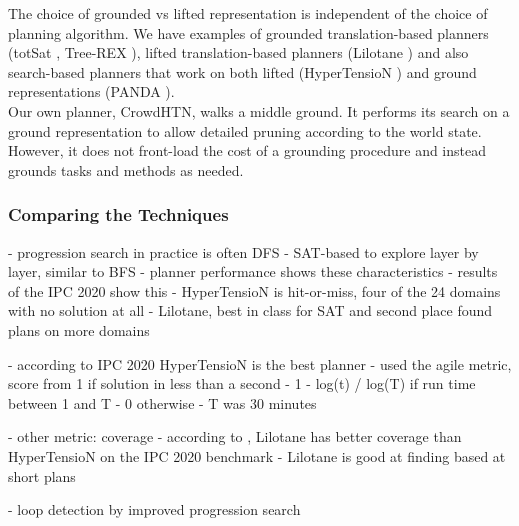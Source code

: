 The choice of grounded vs lifted representation is independent of the choice of planning algorithm. We have examples of grounded translation-based planners (totSat \cite{behnke2018totsat}, Tree-REX \cite{schreiber2019tree}), lifted translation-based planners (Lilotane \cite{schreiber2021lilotane}) and also search-based planners that work on both lifted (HyperTensioN \cite{magnaguagno2020hypertension}) and ground representations (PANDA \cite{holler2020htn}). \\
Our own planner, CrowdHTN, walks a middle ground. It performs its search on a ground representation to allow detailed pruning according to the world state. However, it does not front-load the cost of a grounding procedure and instead grounds tasks and methods as needed.
\begin{comment}
- grounding can be an expensive operation \cite{behnke2020succinct}
- grounding is an active field of research within hierarchical planning \cite{ramoul2017grounding}, \cite{behnke2020succinct}
- a discussion on the benefits and trade-offs of grounding is available in \cite{schreiber2021lilotane}
- grounded representations can have more information available for subsequent pruning, i.e. only a certain parameter combination for a reduction may be invalid but not a whole method
- lifted representations can be a lot more compact 

- efficient grounding is its own research area \cite{behnke2020succinct} \todo{cite the other comparison papers from behnke's work}


- lifted vs grounded
- Lilotane, HyperTensioN
- Panda, CrowdHTN, Tree-Rex
- lifted: more general, less pruning?
\end{comment}

\subsubsection{Comparing the Techniques}
- progression search in practice is often DFS
- SAT-based to explore layer by layer, similar to BFS
- planner performance shows these characteristics
- results of the IPC 2020 show this \cite{behnke2020ipcresults}
- HyperTensioN is hit-or-miss, four of the 24 domains with no solution at all
- Lilotane, best in class for SAT  and second place found plans on more domains

- according to IPC 2020 HyperTensioN is the best planner
- used the agile metric, score from 1 if solution in less than a second
- 1 - log(t) / log(T) if run time between 1 and T
- 0 otherwise
- T was 30 minutes

- other metric: coverage
- according to \cite{schreiber2021lilotane}, Lilotane has better coverage than HyperTensioN on the IPC 2020 benchmark
- Lilotane is good at finding based at short plans

- loop detection by \cite{holler2021loop} improved progression search

